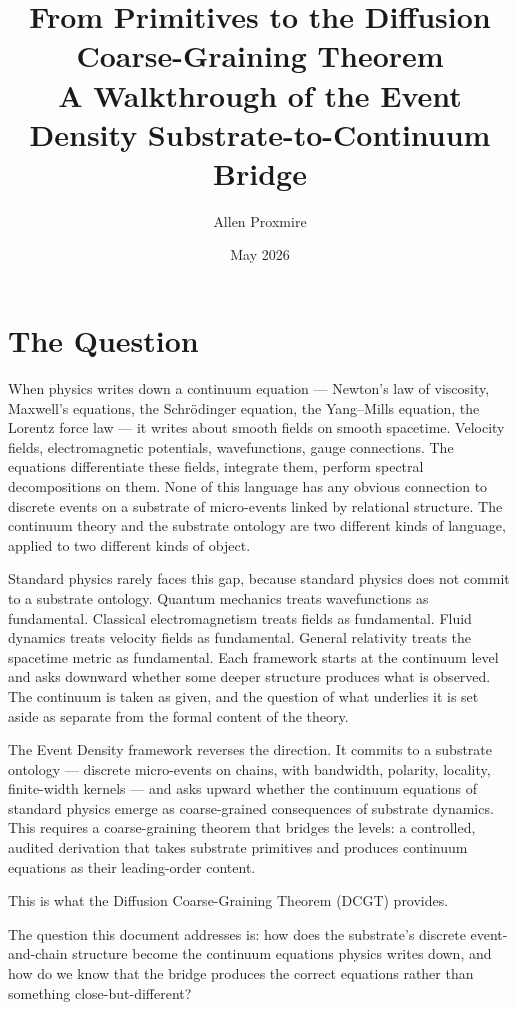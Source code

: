 \documentclass[11pt,a4paper]{article}
\title{\vspace{-1cm}\Large\bfseries From Primitives to the Diffusion Coarse-Graining Theorem\\[6pt]
\large\mdseries A Walkthrough of the Event Density Substrate-to-Continuum Bridge}
\author{Allen Proxmire}
\date{May 2026}
\begin{document}
\maketitle
\thispagestyle{empty}

\section{The Question}

When physics writes down a continuum equation --- Newton's law of viscosity, Maxwell's equations, the Schr\"odinger equation, the Yang--Mills equation, the Lorentz force law --- it writes about smooth fields on smooth spacetime. Velocity fields, electromagnetic potentials, wavefunctions, gauge connections. The equations differentiate these fields, integrate them, perform spectral decompositions on them. None of this language has any obvious connection to discrete events on a substrate of micro-events linked by relational structure. The continuum theory and the substrate ontology are two different kinds of language, applied to two different kinds of object.

Standard physics rarely faces this gap, because standard physics does not commit to a substrate ontology. Quantum mechanics treats wavefunctions as fundamental. Classical electromagnetism treats fields as fundamental. Fluid dynamics treats velocity fields as fundamental. General relativity treats the spacetime metric as fundamental. Each framework starts at the continuum level and asks downward whether some deeper structure produces what is observed. The continuum is taken as given, and the question of what underlies it is set aside as separate from the formal content of the theory.

The Event Density framework reverses the direction. It commits to a substrate ontology --- discrete micro-events on chains, with bandwidth, polarity, locality, finite-width kernels --- and asks upward whether the continuum equations of standard physics emerge as coarse-grained consequences of substrate dynamics. This requires a coarse-graining theorem that bridges the levels: a controlled, audited derivation that takes substrate primitives and produces continuum equations as their leading-order content.

This is what the Diffusion Coarse-Graining Theorem (DCGT) provides.

The question this document addresses is: how does the substrate's discrete event-and-chain structure become the continuum equations physics writes down, and how do we know that the bridge produces the correct equations rather than something close-but-different?
\end{document}
